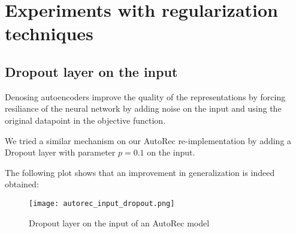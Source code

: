 \section{Experiments with regularization techniques}

\subsection{Dropout layer on the input}

Denosing autoencoders\cite{denoising} improve the quality of the representations
by forcing resiliance of the neural network by adding noise on the input
and using the original datapoint in the objective function.

We tried a similar mechanism on our AutoRec re-implementation
by adding a Dropout \cite{Srivastava2014} layer with parameter $p=0.1$ on the input. 

The following plot shows that an improvement in generalization is indeed obtained:


\begin{figure}[H]
\centering
\texttt{[image: autorec\_input\_dropout.png]}
\caption{Dropout layer on the input of an AutoRec model}
\label{input_dropout_fig}
\end{figure}
